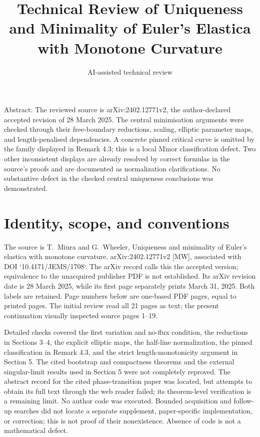 \documentclass[10pt]{article}
\title{Technical Review of
Uniqueness and Minimality of Euler’s Elastica
with Monotone Curvature}
\author{AI-assisted technical review}
\date{}
\begin{document}
\maketitle
Abstract: The reviewed source is arXiv:2402.12771v2, the author-declared accepted revision of 28 March 2025. The central minimisation arguments were checked through their free-boundary reductions, scaling, elliptic parameter maps, and length-penalised dependencies. A concrete pinned critical curve is omitted by the family displayed in Remark 4.3; this is a local Minor classification defect. Two other inconsistent displays are already resolved by correct formulas in the source’s proofs and are documented as normalization clarifications. No substantive defect in the checked central uniqueness conclusions was demonstrated.\par
\section*{Identity, scope, and conventions}
The source is T. Miura and G. Wheeler, Uniqueness and minimality of Euler’s elastica with monotone curvature, arXiv:2402.12771v2 [MW], associated with DOI `10.4171/JEMS/1708`. The arXiv record calls this the accepted version; equivalence to the unacquired publisher PDF is not established. Its arXiv revision date is 28 March 2025, while its first page separately prints March 31, 2025. Both labels are retained. Page numbers below are one-based PDF pages, equal to printed pages. The initial review read all 21 pages as text; the present continuation visually inspected source pages 1–19.\par
Detailed checks covered the first variation and no-flux condition, the reductions in Sections 3–4, the explicit elliptic maps, the half-line normalization, the pinned classification in Remark 4.3, and the strict length-monotonicity argument in Section 5. The cited bootstrap and compactness theorems and the external singular-limit results used in Section 5 were not completely reproved. The abstract record for the cited phase-transition paper was located, but attempts to obtain its full text through the web reader failed; its theorem-level verification is a remaining limit. No author code was executed. Bounded acquisition and follow-up searches did not locate a separate supplement, paper-specific implementation, or correction; this is not proof of their nonexistence. Absence of code is not a mathematical defect.\par
\end{document}
